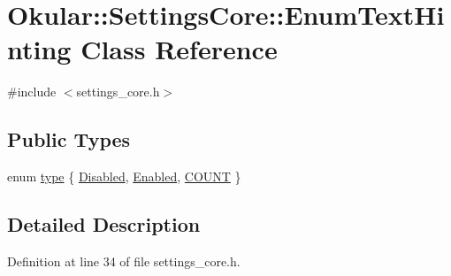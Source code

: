 \hypertarget{classOkular_1_1SettingsCore_1_1EnumTextHinting}{\section{Okular\+:\+:Settings\+Core\+:\+:Enum\+Text\+Hinting Class Reference}
\label{classOkular_1_1SettingsCore_1_1EnumTextHinting}
}


{\ttfamily \#include $<$settings\+\_\+core.\+h$>$}

\subsection*{Public Types}
\begin{DoxyCompactItemize}
\item 
enum \hyperlink{classOkular_1_1SettingsCore_1_1EnumTextHinting_a8b32766d39fec9699e5133223463450f}{type} \{ \hyperlink{classOkular_1_1SettingsCore_1_1EnumTextHinting_a8b32766d39fec9699e5133223463450fa7e7c27a245665e157178bd7a2ad96743}{Disabled}, 
\hyperlink{classOkular_1_1SettingsCore_1_1EnumTextHinting_a8b32766d39fec9699e5133223463450fa86087d31ce91c09a308b4fc59be2e05a}{Enabled}, 
\hyperlink{classOkular_1_1SettingsCore_1_1EnumTextHinting_a8b32766d39fec9699e5133223463450fa2f4829ddd28a53d205c19b3e968620dc}{C\+O\+U\+N\+T}
 \}
\end{DoxyCompactItemize}


\subsection{Detailed Description}


Definition at line 34 of file settings\+\_\+core.\+h.



